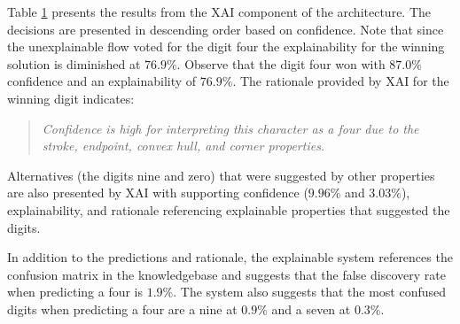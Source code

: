 \begin{figure}[H]
    \renewcommand{\arraystretch}{1.3}
     \label{table:mnist_example1_explanation}
    \begin{center}
    \end{center}
\end{figure}

Table \ref{table:mnist_example1_explanation} presents the results from the XAI
component of the architecture. The decisions are presented in descending order
based on confidence.  Note that since the unexplainable flow voted for the digit
four the explainability for the winning solution is diminished at $76.9\%$.
Observe that the digit four won with $87.0\%$ confidence and an explainability
of $76.9\%$.  The rationale provided by XAI for the winning digit indicates:

\begin{quote}
    \textit{Confidence is high for interpreting this character as a four due to the stroke, endpoint, convex hull, and corner properties.}
\end{quote}

Alternatives (the digits nine and zero) that were suggested by other properties
are also presented by XAI with supporting confidence ($9.96\%$ and $3.03\%$),
explainability, and rationale referencing explainable properties that suggested
the digits.

In addition to the predictions and rationale, the explainable system references
the confusion matrix in the knowledgebase and suggests that the false discovery
rate when predicting a four is $1.9\%$.  The system also suggests that the most
confused digits when predicting a four are a nine at $0.9\%$ and a seven at
$0.3\%$.


